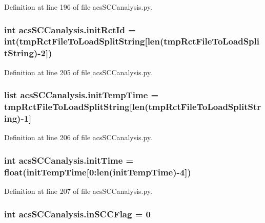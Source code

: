 Definition at line 196 of file acs\+S\+C\+Canalysis.\+py.

\hypertarget{a00130_a212643643fc6b002e8797f16633bb16d}{
\subsubsection[{init\+Rct\+Id}]{\setlength{\rightskip}{0pt plus 5cm}int acs\+S\+C\+Canalysis.\+init\+Rct\+Id = int({\bf tmp\+Rct\+File\+To\+Load\+Split\+String}\mbox{[}len({\bf tmp\+Rct\+File\+To\+Load\+Split\+String})-\/2\mbox{]})}}\label{a00130_a212643643fc6b002e8797f16633bb16d}


Definition at line 205 of file acs\+S\+C\+Canalysis.\+py.

\hypertarget{a00130_adc4403c4cfe080918c8b9da692c50509}{
\subsubsection[{init\+Temp\+Time}]{\setlength{\rightskip}{0pt plus 5cm}list acs\+S\+C\+Canalysis.\+init\+Temp\+Time = {\bf tmp\+Rct\+File\+To\+Load\+Split\+String}\mbox{[}len({\bf tmp\+Rct\+File\+To\+Load\+Split\+String})-\/1\mbox{]}}}\label{a00130_adc4403c4cfe080918c8b9da692c50509}


Definition at line 206 of file acs\+S\+C\+Canalysis.\+py.

\hypertarget{a00130_a826c1b0585b4e8474c76f92bd7583836}{
\subsubsection[{init\+Time}]{\setlength{\rightskip}{0pt plus 5cm}int acs\+S\+C\+Canalysis.\+init\+Time = float({\bf init\+Temp\+Time}\mbox{[}0\+:len({\bf init\+Temp\+Time})-\/4\mbox{]})}}\label{a00130_a826c1b0585b4e8474c76f92bd7583836}


Definition at line 207 of file acs\+S\+C\+Canalysis.\+py.

\hypertarget{a00130_a6405b6b05e7b87812422cc30d2034904}{
\subsubsection[{in\+S\+C\+C\+Flag}]{\setlength{\rightskip}{0pt plus 5cm}int acs\+S\+C\+Canalysis.\+in\+S\+C\+C\+Flag = 0}}\label{a00130_a6405b6b05e7b87812422cc30d2034904}


